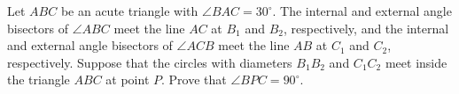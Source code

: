 Let $ABC$ be an acute triangle with $\angle BAC=30^{\circ}$. The internal and external angle bisectors of $\angle ABC$ meet the line $AC$ at $B_1$ and $B_2$, respectively, and the internal and external angle bisectors of $\angle ACB$ meet the line $AB$ at $C_1$ and $C_2$, respectively. Suppose that the circles with diameters $B_1B_2$ and $C_1C_2$ meet inside the triangle $ABC$ at point $P$. Prove that $\angle BPC=90^{\circ}$.
